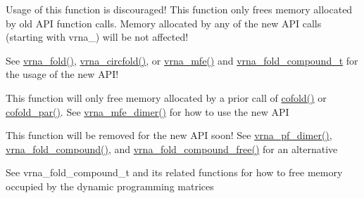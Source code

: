 \begin{DoxyRefList}
\item[\label{deprecated__deprecated000022}%
\Hypertarget{deprecated__deprecated000022}%
Global \hyperlink{group__consensus__pf__fold_ga0c0498f35686e26b38ee460d3db1a661}{free\+\_\+alipf\+\_\+arrays} (void)]Usage of this function is discouraged! This function only free\textquotesingle{}s memory allocated by old A\+PI function calls. Memory allocated by any of the new A\+PI calls (starting with vrna\+\_\+) will be not affected! 
\item[\label{deprecated__deprecated000073}%
\Hypertarget{deprecated__deprecated000073}%
Global \hyperlink{group__mfe__fold__single_ga107fdfe5fd641868156bfd849f6866c7}{free\+\_\+arrays} (void)]See \hyperlink{group__mfe__fold__single_ga29a33b2895f4e67b0480271ff289afdc}{vrna\+\_\+fold()}, \hyperlink{group__mfe__fold__single_gaf973483d8acbc8cc9aacfc8a9b7f0074}{vrna\+\_\+circfold()}, or \hyperlink{group__mfe__fold_gabd3b147371ccf25c577f88bbbaf159fd}{vrna\+\_\+mfe()} and \hyperlink{group__fold__compound_ga1b0cef17fd40466cef5968eaeeff6166}{vrna\+\_\+fold\+\_\+compound\+\_\+t} for the usage of the new A\+P\+I! 
\item[\label{deprecated__deprecated000032}%
\Hypertarget{deprecated__deprecated000032}%
Global \hyperlink{group__mfe__cofold_gaafb33d7473eb9af9d1b168ca8761c41a}{free\+\_\+co\+\_\+arrays} (void)]This function will only free memory allocated by a prior call of \hyperlink{group__mfe__cofold_gabc8517f22cfe70595ee81fc837910d52}{cofold()} or \hyperlink{group__mfe__cofold_ga7612cfeeb1b793f1e4179b1eb53df1f3}{cofold\+\_\+par()}. See \hyperlink{group__mfe__cofold_gaab22d10c1190f205f16a77cab9d5d3ee}{vrna\+\_\+mfe\+\_\+dimer()} for how to use the new A\+PI 
\item[\label{deprecated__deprecated000124}%
\Hypertarget{deprecated__deprecated000124}%
Global \hyperlink{part__func__co_8h_ade3ce34ae8214811374b1d28a40dc247}{free\+\_\+co\+\_\+pf\+\_\+arrays} (void)]This function will be removed for the new A\+PI soon! See \hyperlink{group__pf__cofold_ga4e5c7d06c302a7c59fc0d64dc142ca63}{vrna\+\_\+pf\+\_\+dimer()}, \hyperlink{group__fold__compound_ga6601d994ba32b11511b36f68b08403be}{vrna\+\_\+fold\+\_\+compound()}, and \hyperlink{group__fold__compound_gadded6039d63f5d6509836e20321534ad}{vrna\+\_\+fold\+\_\+compound\+\_\+free()} for an alternative  
\item[\label{deprecated__deprecated000106}%
\Hypertarget{deprecated__deprecated000106}%
Global \hyperlink{group__pf__fold_gae73db3f49a94f0f72e067ecd12681dbd}{free\+\_\+pf\+\_\+arrays} (void)]See vrna\+\_\+fold\+\_\+compound\+\_\+t and its related functions for how to free memory occupied by the dynamic programming matrices 

\end{DoxyRefList}
